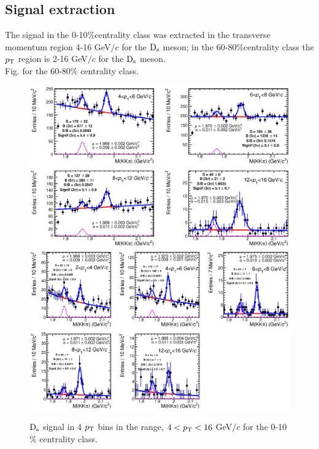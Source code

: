 \subsection{Signal extraction}
 The signal in the 0-10$\%$centrality class was extracted in the transverse
momentum region 4-16 GeV$/c$ for the ${\rm D_s}$ meson; in the 60-80$\%$centrality class the $p_{\rm T}$ region is 2-16 GeV$/c$ for the ${\rm D_s}$ meson.\\
Fig. for the 60-80$\%$ centrality class.

\begin{figure}[!htbp]
 \begin{center}
  \includegraphics[angle=0, width=15cm]{FigCap5/DsMassHistos_010.eps}
   \includegraphics[angle=0, width=15cm]{FigCap5/DsMassHistos_6080.eps}
\end{center}
 \caption{${\rm D_s}$ signal in 4 $p_{\rm T}$ bins in the range, $4<p_{\rm T}<16$ GeV$/c$ for the 0-10$\%$ centrality class. }
 \label{FigInvMassDs_010} 
\end{figure} 
 

